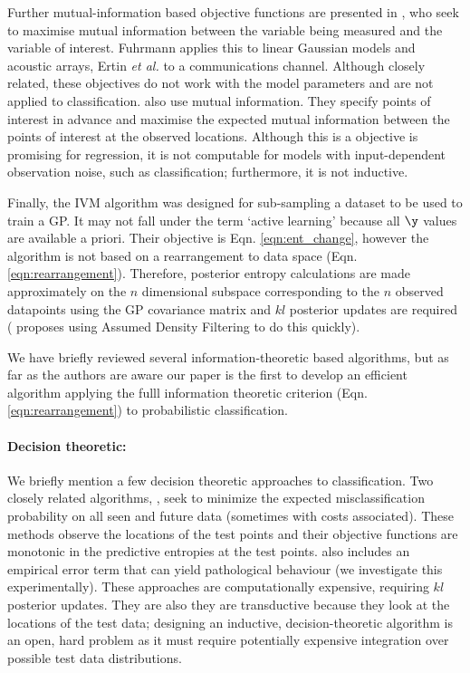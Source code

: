 Further mutual-information based objective functions are presented in \citep{ertin2003,fuhrmann2003}, who seek to maximise mutual information between the variable being measured and the variable of interest. Fuhrmann \citep{fuhrmann2003} applies this to linear Gaussian models and acoustic arrays, Ertin \emph{et al.} \citep{ertin2003} to a communications channel. Although closely related, these objectives do not work with the model parameters and are not applied to classification. \citep{guestrin2005, krause2006, krause2007} also use mutual information. They specify points of interest in advance and maximise the expected mutual information between the points of interest at the observed locations. Although this is a objective is promising for regression, it is not computable for models with input-dependent observation noise, such as classification; furthermore, it is not inductive.

Finally, the IVM \citep{lawrence2004} algorithm was designed for sub-sampling a dataset to be used to train a GP. It may not fall under the term `active learning' because all $\y$ values are available a priori. Their objective is Eqn. \eqref{eqn:ent_change}, however the algorithm is not based on a rearrangement to data space (Eqn. \eqref{eqn:rearrangement}). Therefore, posterior entropy calculations are made approximately on the $n$ dimensional subspace corresponding to the $n$ observed datapoints using the GP covariance matrix and $kl$ posterior updates are required (\citep{lawrence2004} proposes using Assumed Density Filtering to do this quickly).

We have briefly reviewed several information-theoretic based algorithms, but as far as the authors are aware our paper is the first to develop an efficient algorithm applying the fulll information theoretic criterion (Eqn. \eqref{eqn:rearrangement}) to probabilistic classification.

\paragraph{Decision theoretic:} We briefly mention a few decision theoretic approaches to classification. Two closely related algorithms, \citep{kapoor2007, zhu2003}, seek to minimize the expected misclassification probability on all seen and future data (sometimes with costs associated). These methods observe the locations of the test points and their objective functions are monotonic in the predictive entropies at the test points. \citep{kapoor2007} also includes an empirical error term that can yield pathological behaviour (we investigate this experimentally). These approaches are computationally expensive, requiring $kl$ posterior updates. They are also they are transductive because they look at the locations of the test data; designing an inductive, decision-theoretic algorithm  is an open, hard problem as it must require potentially expensive integration over possible test data distributions.

